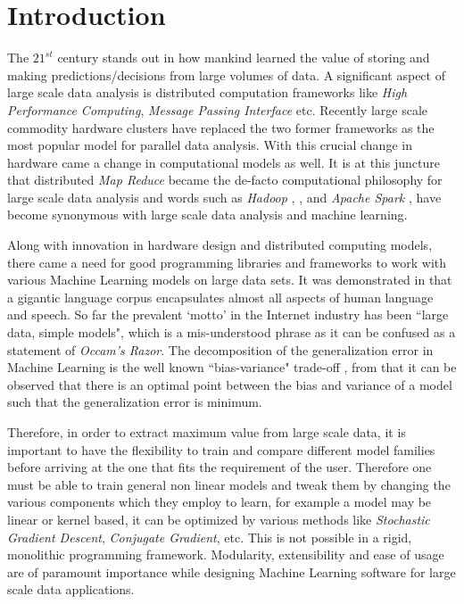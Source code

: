 \documentclass[conference, cmex10]{IEEEtran}
\begin{document}
\section{Introduction} \label{introduction}
The $21^{st}$ century stands out in how mankind learned the value of storing and making predictions/decisions from large volumes of data. A significant aspect of large scale data analysis is distributed computation frameworks like \textit{High Performance Computing}, \textit{Message Passing Interface} etc. Recently large scale commodity hardware clusters have replaced the two former frameworks as the most popular model for parallel data analysis. With this crucial change in hardware came a change in computational models as well. It is at this juncture that distributed \textit{Map Reduce} became the de-facto computational philosophy for large scale data analysis and  words such as \textit{Hadoop} \cite{Hadoop:2005}, \cite{chang2008bigtable}, \cite{Borthakur2011} and \textit{Apache Spark} \cite{Zaharia2010}, \cite{Spark:2010} have become synonymous with large scale data analysis and machine learning.

Along with innovation in hardware design and distributed computing models, there came a need for good programming libraries and frameworks to work with various Machine Learning models on large data sets. It was demonstrated in \cite{10.1109/MIS.2009.36} that a gigantic language corpus encapsulates almost all aspects of human language and speech. So far the prevalent `motto' in the Internet industry has been ``large data, simple models", which is a mis-understood phrase as it can be confused as a statement of \textit{Occam's Razor}. The decomposition of the generalization error in Machine Learning is the well known ``bias-variance" trade-off \cite{Valentini2004}, from that it can be observed that there is an optimal point between the bias and variance of a model such that the generalization error is minimum.

Therefore, in order to extract maximum value from large scale data, it is important to have the flexibility to train and compare different model families before arriving at the one that fits the requirement of the user. Therefore one must be able to train general non linear models and tweak them by changing the various components which they employ to learn, for example a model may be linear or kernel based, it can be optimized by various methods like \textit{Stochastic Gradient Descent}, \textit{Conjugate Gradient}, etc. This is not possible in a rigid, monolithic programming framework. Modularity, extensibility and ease of usage are of paramount importance while designing Machine Learning software for large scale data applications.
\end{document}
